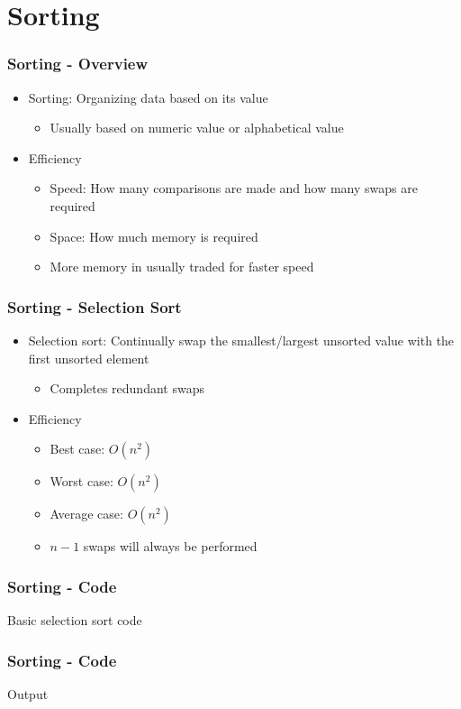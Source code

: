 \documentclass[c, aspectratio=169]{beamer}
\begin{document}
\section{Sorting}
\begin{frame}\frametitle{Sorting - Overview}
\begin{itemize}
\item Sorting: Organizing data based on its value
	\begin{itemize}
	\item Usually based on numeric value or alphabetical value
	\end{itemize}
\item Efficiency
	\begin{itemize}
	\item Speed: How many comparisons are made and how many swaps are required
	\item Space: How much memory is required
	\item More memory in usually traded for faster speed
	\end{itemize}
\end{itemize}
\end{frame}

\begin{frame}\frametitle{Sorting - Selection Sort}
\begin{itemize}
\item Selection sort: Continually swap the smallest/largest unsorted value with the first unsorted element
	\begin{itemize}
	\item Completes redundant swaps
	\end{itemize}
\item Efficiency
	\begin{itemize}
	\item Best case: $O(n^2)$
	\item Worst case: $O(n^2)$
	\item Average case: $O(n^2)$
	\item $n - 1$ swaps will always be performed
	\end{itemize}
\end{itemize}
\end{frame}

\begin{frame}\frametitle{Sorting - Code}
Basic selection sort code

\end{frame}

\begin{frame}\frametitle{Sorting - Code}
Output

\end{frame}
\end{document}
